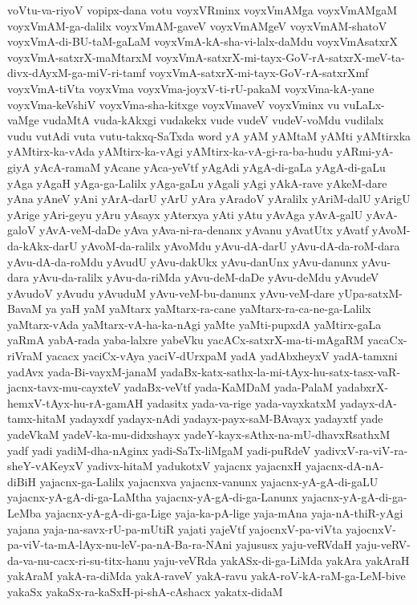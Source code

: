 {voVtu-va-riyoV
vopipx-dana
votu
voyxVRminx
voyxVmAMga
voyxVmAMgaM
voyxVmAM-ga-dalilx
voyxVmAM-gaveV
voyxVmAMgeV
voyxVmAM-shatoV
voyxVmA-di-BU-taM-gaLaM
voyxVmA-kA-sha-vi-lalx-daMdu
voyxVmAsatxrX
voyxVmA-satxrX-maMtarxM
voyxVmA-satxrX-mi-tayx-GoV-rA-satxrX-meV-ta-divx-dAyxM-ga-miV-ri-tamf
voyxVmA-satxrX-mi-tayx-GoV-rA-satxrXmf
voyxVmA-tiVta
voyxVma
voyxVma-joyxV-ti-rU-pakaM
voyxVma-kA-yane
voyxVma-keVshiV
voyxVma-sha-kitxge
voyxVmaveV
voyxVminx
vu
vuLaLx-vaMge
vudaMtA
vuda-kAkxgi
vudakekx
vude
vudeV
vudeV-voMdu
vudilalx
vudu
vutAdi
vuta
vutu-takxq-SaTxda
word
yA
yAM
yAMtaM
yAMti
yAMtirxka
yAMtirx-ka-vAda
yAMtirx-ka-vAgi
yAMtirx-ka-vA-gi-ra-ba-hudu
yARmi-yA-giyA
yAcA-ramaM
yAcane
yAca-yeVtf
yAgAdi
yAgA-di-gaLa
yAgA-di-gaLu
yAga
yAgaH
yAga-ga-Lalilx
yAga-gaLu
yAgali
yAgi
yAkA-rave
yAkeM-dare
yAna
yAneV
yAni
yArA-darU
yArU
yAra
yAradoV
yAralilx
yAriM-dalU
yArigU
yArige
yAri-geyu
yAru
yAsayx
yAterxya
yAti
yAtu
yAvAga
yAvA-galU
yAvA-galoV
yAvA-veM-daDe
yAva
yAva-ni-ra-denanx
yAvanu
yAvatUtx
yAvatf
yAvoM-da-kAkx-darU
yAvoM-da-ralilx
yAvoMdu
yAvu-dA-darU
yAvu-dA-da-roM-dara
yAvu-dA-da-roMdu
yAvudU
yAvu-dakUkx
yAvu-danUnx
yAvu-danunx
yAvu-dara
yAvu-da-ralilx
yAvu-da-riMda
yAvu-deM-daDe
yAvu-deMdu
yAvudeV
yAvudoV
yAvudu
yAvuduM
yAvu-veM-bu-danunx
yAvu-veM-dare
yUpa-satxM-BavaM
ya
yaH
yaM
yaMtarx
yaMtarx-ra-cane
yaMtarx-ra-ca-ne-ga-Lalilx
yaMtarx-vAda
yaMtarx-vA-ha-ka-nAgi
yaMte
yaMti-pupxdA
yaMtirx-gaLa
yaRmA
yabA-rada
yaba-lalxre
yabeVku
yacACx-satxrX-ma-ti-mAgaRM
yacaCx-riVraM
yacacx
yaciCx-vAya
yaciV-dUrxpaM
yadA
yadAbxheyxV
yadA-tamxni
yadAvx
yada-Bi-vayxM-janaM
yadaBx-katx-sathx-la-mi-tAyx-hu-satx-tasx-vaR-jacnx-tavx-mu-cayxteV
yadaBx-veVtf
yada-KaMDaM
yada-PalaM
yadabxrX-hemxV-tAyx-hu-rA-gamAH
yadasitx
yada-va-rige
yada-vayxkatxM
yadayx-dA-tamx-hitaM
yadayxdf
yadayx-nAdi
yadayx-payx-saM-BAvayx
yadayxtf
yade
yadeVkaM
yadeV-ka-mu-didxshayx
yadeY-kayx-sAthx-na-mU-dhavxRsathxM
yadf
yadi
yadiM-dha-nAginx
yadi-SaTx-liMgaM
yadi-puRdeV
yadivxV-ra-viV-ra-sheY-vAKeyxV
yadivx-hitaM
yadukotxV
yajacnx
yajacnxH
yajacnx-dA-nA-diBiH
yajacnx-ga-Lalilx
yajacnxva
yajacnx-vanunx
yajacnx-yA-gA-di-gaLU
yajacnx-yA-gA-di-ga-LaMtha
yajacnx-yA-gA-di-ga-Lanunx
yajacnx-yA-gA-di-ga-LeMba
yajacnx-yA-gA-di-ga-Lige
yaja-ka-pA-lige
yaja-mAna
yaja-nA-thiR-yAgi
yajana
yaja-na-savx-rU-pa-mUtiR
yajati
yajeVtf
yajocnxV-pa-viVta
yajocnxV-pa-viV-ta-mA-lAyx-nu-leV-pa-nA-Ba-ra-NAni
yajususx
yaju-veRVdaH
yaju-veRV-da-va-nu-cacx-ri-su-titx-hanu
yaju-veVRda
yakASx-di-ga-LiMda
yakAra
yakAraH
yakAraM
yakA-ra-diMda
yakA-raveV
yakA-ravu
yakA-roV-kA-raM-ga-LeM-bive
yakaSx
yakaSx-ra-kaSxH-pi-shA-cAshacx
yakatx-didaM
}
